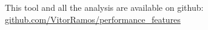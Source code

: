 
This tool and all the analysis are available on github: \url{github.com/VitorRamos/performance_features}


%
